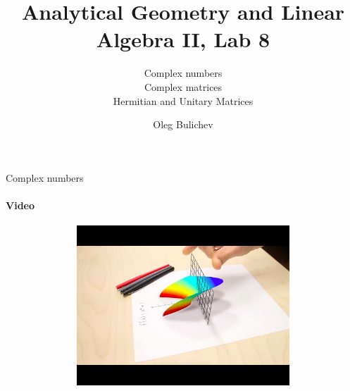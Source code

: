 \documentclass[aspectratio=169]{beamer}
\title[AGLA2]{Analytical Geometry and Linear Algebra II, Lab 8} %
\subtitle{Complex numbers \\ Complex matrices \\ Hermitian and Unitary Matrices 
         } %
\author{Oleg Bulichev}
\newcommand{\fbckg}[1]{\usebackgroundtemplate{\texttt{[image: \#1]}}}%
\begin{document}
\setlength{\abovedisplayskip}{0pt}
\setlength{\belowdisplayskip}{0pt}
\setlength{\abovedisplayshortskip}{0pt}
\setlength{\belowdisplayshortskip}{0pt}

\fbckg{fibeamer/figs/title_page.png}

\fbckg{fibeamer/figs/common.png}

\begin{frame}[t]{Complex numbers}
    \framesubtitle{Video}
    \vspace{-0.6cm}
    \begin{figure}[H]
        \href{https://youtu.be/T647CGsuOVU}{
            \centering\includegraphics[height=6cm,width=1\textwidth,keepaspectratio]{im_video.jpg}}
        \label{fig:im_video.jpg}
    \end{figure}
\end{frame}
\end{document}
